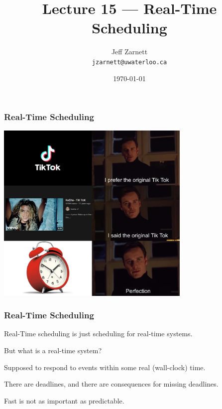 

\title{Lecture 15 --- Real-Time Scheduling}

\author{Jeff Zarnett \\ \small \texttt{jzarnett@uwaterloo.ca}}
\date{\today}




\begin{frame}
  \titlepage

 \end{frame}
 
\begin{frame}
\frametitle{Real-Time Scheduling}


\begin{center}
	\includegraphics[width=0.7\textwidth]{images/tiktok.jpg}
\end{center}

\end{frame}

\begin{frame}
\frametitle{Real-Time Scheduling}

Real-Time scheduling is just scheduling for real-time systems.

But what is a real-time system?

Supposed to respond to events within some real (wall-clock) time. 

There are deadlines, and there are consequences for missing deadlines. 

Fast is not as important as predictable.

\end{frame}

